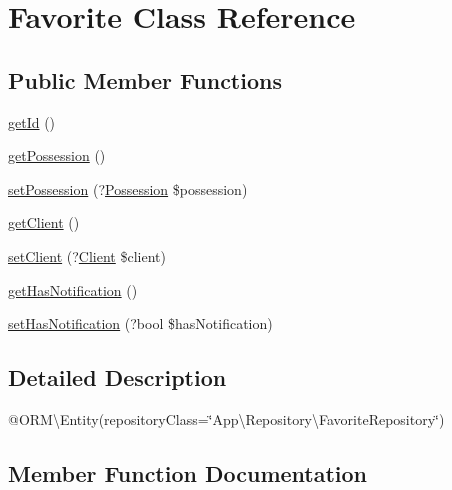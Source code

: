 \hypertarget{class_app_1_1_entity_1_1_favorite}{}\section{Favorite Class Reference}
\label{class_app_1_1_entity_1_1_favorite}
\subsection*{Public Member Functions}
\begin{DoxyCompactItemize}
\item 
\mbox{\hyperlink{class_app_1_1_entity_1_1_favorite_a12251d0c022e9e21c137a105ff683f13}{get\+Id}} ()
\item 
\mbox{\hyperlink{class_app_1_1_entity_1_1_favorite_a4ad5c74255a75f0d61664cba32657af7}{get\+Possession}} ()
\item 
\mbox{\hyperlink{class_app_1_1_entity_1_1_favorite_ad625cd7a23ddbd219c5f6b58e85f2977}{set\+Possession}} (?\mbox{\hyperlink{class_app_1_1_entity_1_1_possession}{Possession}} \$possession)
\item 
\mbox{\hyperlink{class_app_1_1_entity_1_1_favorite_a2f5f44fdf5404c87cc3a7b5719d85306}{get\+Client}} ()
\item 
\mbox{\hyperlink{class_app_1_1_entity_1_1_favorite_a8122a5458a0e4aa14a4a16840c769a64}{set\+Client}} (?\mbox{\hyperlink{class_app_1_1_entity_1_1_client}{Client}} \$client)
\item 
\mbox{\hyperlink{class_app_1_1_entity_1_1_favorite_ae3e9c50913a049d374722d524d87b506}{get\+Has\+Notification}} ()
\item 
\mbox{\hyperlink{class_app_1_1_entity_1_1_favorite_ae73b1cb7feef9301feb1cb0b3b6e6531}{set\+Has\+Notification}} (?bool \$has\+Notification)
\end{DoxyCompactItemize}


\subsection{Detailed Description}
@\+O\+RM\textbackslash{}\+Entity(repository\+Class=\char`\"{}\+App\textbackslash{}\+Repository\textbackslash{}\+Favorite\+Repository\char`\"{}) 

\subsection{Member Function Documentation}
\mbox{\label{class_app_1_1_entity_1_1_favorite_a2f5f44fdf5404c87cc3a7b5719d85306}} 
